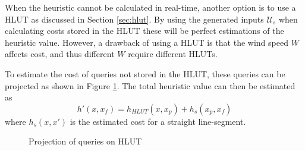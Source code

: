 When the heuristic cannot be calculated in real-time, another option is to use a HLUT as discussed in Section \ref{sec:hlut}. By using the generated 
inputs $\mathcal{U}_s$ when calculating costs stored in the HLUT these will be perfect estimations of the heuristic value. However, a drawback of 
using a HLUT is that the wind speed $W$ affects cost, and thus different $W$ require different HLUTs. 

To estimate the cost of queries not stored in the HLUT, these queries can be projected as shown in Figure \ref{fig:hlut_proj}. The total heuristic value can then be estimated as 
\begin{equation}
    h'(x, x_f) = h_{HLUT}(x, x_p) + h_s(x_p, x_f)
\end{equation}
where $h_s(x, x')$ is the estimated cost for a straight line-segment.
\begin{figure}
    \begin{center}
    \end{center}
    \caption{Projection of queries on HLUT}
    \label{fig:hlut_proj}
\end{figure}

